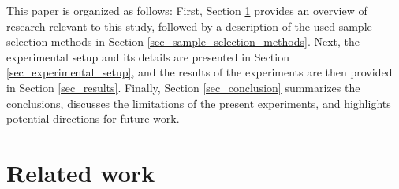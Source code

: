 \documentclass[a4paper,fleqn]{cas-dc}
\begin{document}
This paper is organized as follows: First, Section \ref{sec_related_work} provides an overview of research relevant to this study, followed by a description of the used sample selection methods in Section \ref{sec_sample_selection_methods}. Next, the experimental setup and its details are presented in Section \ref{sec_experimental_setup}, and the results of the experiments are then provided in Section \ref{sec_results}. Finally, Section \ref{sec_conclusion} summarizes the conclusions, discusses the limitations of the present experiments, and highlights potential directions for future work.


\section{Related work} \label{sec_related_work}
\end{document}
